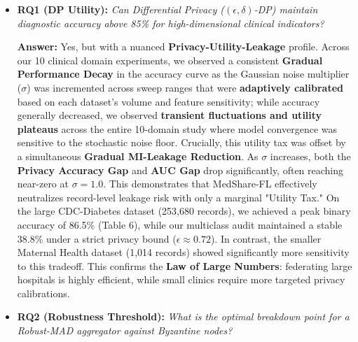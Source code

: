 \documentclass[10pt, a4paper, twocolumn]{article}
\begin{document}
\begin{itemize}
    \item \textbf{RQ1 (DP Utility):} \textit{Can Differential Privacy ($(\epsilon, \delta)$-DP) maintain diagnostic accuracy above 85\% for high-dimensional clinical indicators?} 
    
    \textbf{Answer:} Yes, but with a nuanced \textbf{Privacy-Utility-Leakage} profile. Across our 10 clinical domain experiments, we observed a consistent \textbf{Gradual Performance Decay} in the accuracy curve as the Gaussian noise multiplier ($\sigma$) was incremented across sweep ranges that were \textbf{adaptively calibrated} based on each dataset's volume and feature sensitivity; while accuracy generally decreased, we observed \textbf{transient fluctuations and utility plateaus} across the entire 10-domain study where model convergence was sensitive to the stochastic noise floor. Crucially, this utility tax was offset by a simultaneous \textbf{Gradual MI-Leakage Reduction}. As $\sigma$ increases, both the \textbf{Privacy Accuracy Gap} and \textbf{AUC Gap} drop significantly, often reaching near-zero at $\sigma=1.0$. This demonstrates that MedShare-FL effectively neutralizes record-level leakage risk with only a marginal "Utility Tax." On the large CDC-Diabetes dataset (253,680 records), we achieved a peak binary accuracy of 86.5\% (Table 6), while our multiclass audit maintained a stable 38.8\% under a strict privacy bound ($\epsilon \approx 0.72$). In contrast, the smaller Maternal Health dataset (1,014 records) showed significantly more sensitivity to this tradeoff. This confirms the \textbf{Law of Large Numbers}: federating large hospitals is highly efficient, while small clinics require more targeted privacy calibrations.

    \item \textbf{RQ2 (Robustness Threshold):} \textit{What is the optimal breakdown point for a Robust-MAD aggregator against Byzantine nodes?}
    

\end{itemize}
\end{document}
